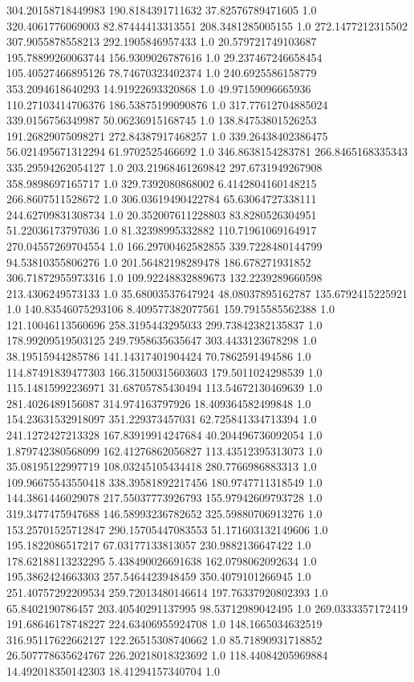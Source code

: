 304.20158718449983	190.8184391711632	37.82576789471605	1.0
320.4061776069003	82.87444413313551	208.3481285005155	1.0
272.1477212315502	307.9055878558213	292.1905846957433	1.0
20.579721749103687	195.78899260063744	156.9309026787616	1.0
29.237467246658454	105.40527466895126	78.74670323402374	1.0
240.6925586158779	353.2094618640293	14.91922693320868	1.0
49.97159096665936	110.27103414706376	186.53875199090876	1.0
317.77612704885024	339.0156756349987	50.06236915168745	1.0
138.84753801526253	191.26829075098271	272.84387917468257	1.0
339.26438402386475	56.021495671312294	61.9702525466692	1.0
346.8638154283781	266.8465168335343	335.29594262054127	1.0
203.21968461269842	297.6731949267908	358.9898697165717	1.0
329.7392080868002	6.4142804160148215	266.8607511528672	1.0
306.03619490422784	65.63064727338111	244.62709831308734	1.0
20.352007611228803	83.8280526304951	51.22036173797036	1.0
81.32398995332882	110.71961069164917	270.04557269704554	1.0
166.29700462582855	339.7228480144799	94.53810355806276	1.0
201.56482198289478	186.678271931852	306.71872955973316	1.0
109.92248832889673	132.2239289660598	213.4306249573133	1.0
35.68003537647924	48.08037895162787	135.6792415225921	1.0
140.83546075293106	8.409577382077561	159.7915585562388	1.0
121.10046113560696	258.3195443295033	299.73842382135837	1.0
178.99209519503125	249.7958635635647	303.4433123678298	1.0
38.19515944285786	141.14317401904424	70.7862591494586	1.0
114.87491839477303	166.31500315603603	179.5011024298539	1.0
115.14815992236971	31.68705785430494	113.54672130469639	1.0
281.4026489156087	314.974163797926	18.409364582499848	1.0
154.23631532918097	351.229373457031	62.725841334713394	1.0
241.1272427213328	167.83919914247684	40.204496736092054	1.0
1.879742380568099	162.41276862056827	113.43512395313073	1.0
35.08195122997719	108.03245105434418	280.7766986883313	1.0
109.96675543550418	338.39581892217456	180.9747711318549	1.0
144.3861446029078	217.55037773926793	155.97942609793728	1.0
319.3477475947688	146.58993236782652	325.59880706913276	1.0
153.25701525712847	290.15705447083553	51.171603132149606	1.0
195.1822086517217	67.03177133813057	230.9882136647422	1.0
178.62188113232295	5.438490026691638	162.0798062092634	1.0
195.3862424663303	257.5464423948459	350.4079101266945	1.0
251.40757292209534	259.72013480146614	197.76337920802393	1.0
65.8402190786457	203.40540291137995	98.53712989042495	1.0
269.0333357172419	191.68646178748227	224.63406955924708	1.0
148.1665034632519	316.95117622662127	122.26515308740662	1.0
85.71890931718852	26.507778635624767	226.20218018323692	1.0
118.44084205969884	14.492018350142303	18.41294157340704	1.0
